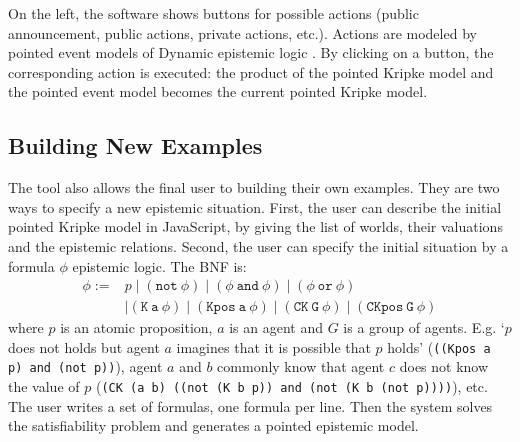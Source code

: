 \documentclass{article}
\begin{document}
On the left, the software shows buttons for possible actions (public announcement, public actions, private actions, etc.). Actions are modeled by pointed event models of Dynamic epistemic logic \cite{baltag1998logic}. By clicking on a button, the corresponding action is executed: the product of the pointed Kripke model and the pointed event model becomes the current pointed Kripke model.



\subsection{Building New Examples}

The tool also allows the final user to building their own examples. They are two ways to specify a new epistemic situation. First, the user can describe the initial pointed Kripke model in JavaScript, by giving the list of worlds, their valuations and the epistemic relations. Second, the user can specify the initial situation by a formula $\phi$ epistemic logic. The BNF is:
%
%	
$$\begin{array}{ll}\phi := & p \mid (\mathtt{not~} \phi) \mid (\phi \mathtt {~and~} \phi) \mid (\phi \mathtt {~or~} \phi)  \\ & \mid \mathtt{(K~a~\phi)} \mid \mathtt{(Kpos~a~\phi)} \mid \mathtt{(CK~G~\phi)}\mid \mathtt{(CKpos~G~\phi)}\end{array}$$
%
where $p$ is an atomic proposition, $a$ is an agent and $G$ is a group of agents. E.g. `$p$ does not holds but agent $a$ imagines that it is possible that $p$ holds' (\texttt{((Kpos a p) and (not p))}), agent $a$ and $b$ commonly know that agent $c$ does not know the value of $p$ (\texttt{(CK (a b) ((not (K b p)) and (not (K b (not p))))}), etc. The user writes a set of formulas, one formula per line.
%
%	
Then the system solves the satisfiability problem and generates a pointed epistemic model.



\end{document}
